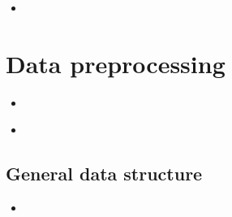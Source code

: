 \documentclass[compress, ucs, xelatex, 11pt, xcolor=x11names, aspectratio=1609,
	hyperref={
		bookmarks=true,
		unicode=true,
		colorlinks=true,
		pdftitle={HybSeq course},
		plainpages=false,
		pdfauthor={Vojtech Zeisek},
		pdfsubject={Practical processing of HybSeq target enrichment sequencing data on computing grids like MetaCentrum},
		pdfcreator={XeLaTeX},
		pdfkeywords={BASH, command line, GNU, HybSeq, Linux, MetaCentrum, sequencing shell, target enrichment},
		linkcolor=Cyan2, %
		anchorcolor=Firebrick2, %
		citecolor=Firebrick2, %
		filecolor=Firebrick2, %
		menucolor=Firebrick2, %
		urlcolor=Chartreuse2, %
		pdftex},
	url={hyphens, lowtilde} %
	]{beamer}
\begin{document}
\begin{frame}[fragile]{}
	\begin{itemize}
		\item 
	\end{itemize}
	\begin{spluscode}
    
	\end{spluscode}
	\begin{bashcode}
    
	\end{bashcode}
\end{frame}

\section{Data preprocessing}

\begin{frame}[fragile]{}
	\begin{itemize}
		\item 
	\end{itemize}
	\begin{spluscode}
    
	\end{spluscode}
	\begin{bashcode}
    
	\end{bashcode}
\end{frame}

\begin{frame}[fragile]{}
	\begin{itemize}
		\item 
	\end{itemize}
	\begin{spluscode}
    
	\end{spluscode}
	\begin{bashcode}
    
	\end{bashcode}
\end{frame}

\subsection{General data structure}

\begin{frame}[fragile]{}
	\begin{itemize}
		\item 
	\end{itemize}
	\begin{spluscode}
    
	\end{spluscode}
	\begin{bashcode}
    
	\end{bashcode}
\end{frame}
\end{document}
